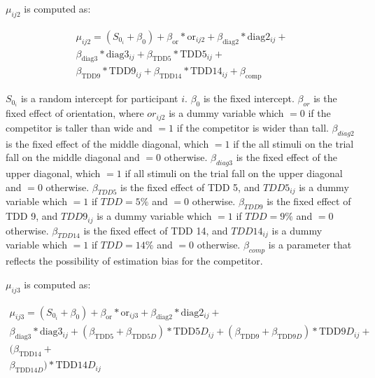 $\mu_{ij2}$ is computed as:

\begin{equation}
    \begin{aligned}
        \mu_{ij2}=(S_{0_i} + \beta_{0}) + \beta_{\mathrm{or}}*\mathrm{or}_{ij2} + \beta_{\mathrm{diag}2}*\mathrm{diag}2_{ij}+ \\\beta_{\mathrm{diag}3}*\mathrm{diag}3_{ij} + \beta_{\mathrm{TDD}5}*\mathrm{TDD}5_{ij} + \\\beta_{\mathrm{TDD}9}*\mathrm{TDD}9_{ij} + \beta_{\mathrm{TDD}14}*\mathrm{TDD}14_{ij} + \beta_{\mathrm{comp}}
        \label{circle_mu_eqn2}
    \end{aligned}
\end{equation}

$S_{0_i}$ is a random intercept for participant $i$. $\beta_{0}$ is the fixed intercept. $\beta_{or}$ is the fixed effect of orientation, where $or_{ij2}$ is a dummy variable which $=0$ if the competitor is taller than wide and $=1$ if the competitor is wider than tall. $\beta_{diag2}$ is the fixed effect of the middle diagonal, which $=1$ if the all stimuli on the trial fall on the middle diagonal and $=0$ otherwise. $\beta_{diag3}$ is the fixed effect of the upper diagonal, which $=1$ if all stimuli on the trial fall on the upper diagonal and $=0$ otherwise. $\beta_{TDD5}$ is the fixed effect of TDD 5, and $TDD5_{ij}$ is a dummy variable which $=1$ if $TDD=5\%$ and $=0$ otherwise. $\beta_{TDD9}$ is the fixed effect of TDD 9, and $TDD9_{ij}$ is a dummy variable which $=1$ if $TDD=9\%$ and $=0$ otherwise. $\beta_{TDD14}$ is the fixed effect of TDD 14, and $TDD14_{ij}$ is a dummy variable which $=1$ if $TDD=14\%$ and $=0$ otherwise. $\beta_{comp}$ is a parameter that reflects the possibility of estimation bias for the competitor.

$\mu_{ij3}$ is computed as:

\begin{equation}
    \begin{aligned}
        \mu_{ij3}=(S_{0_i} + \beta_{0}) + \beta_{\mathrm{or}}*\mathrm{or}_{ij3} + \beta_{\mathrm{diag}2}*\mathrm{diag}2_{ij}+ \\\beta_{\mathrm{diag}3}*\mathrm{diag}3_{ij} + (\beta_{\mathrm{TDD}5} + \beta_{\mathrm{TDD}5D})*\mathrm{TDD}5D_{ij} + (\beta_{\mathrm{TDD}9} + \beta_{\mathrm{TDD}9D})*\mathrm{TDD}9D_{ij} +\\ (\beta_{\mathrm{TDD}14} +\\ \beta_{\mathrm{TDD}14D})*\mathrm{TDD}14D_{ij}
        \label{circle_mu_eqn3}
    \end{aligned}
\end{equation}

